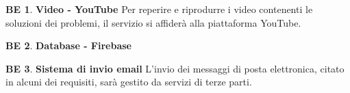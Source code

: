\documentclass[11pt, a4paper]{article}
\theoremstyle{definition}
\newtheorem{backend}{BE}
\begin{document}
\begin{backend}
\textbf{Video - YouTube }
Per reperire e riprodurre i video contenenti le soluzioni dei problemi,
il servizio si affiderà alla piattaforma YouTube.
\end{backend}

\begin{backend}
\textbf{Database - Firebase }

\end{backend}

\begin{backend}
\textbf{Sistema di invio email }
L'invio dei messaggi di posta elettronica, citato in alcuni dei requisiti,
sarà gestito da servizi di terze parti.
\end{backend}
\end{document}
